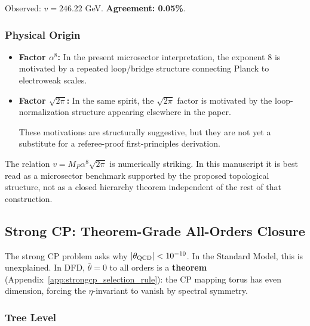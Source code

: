 Observed: $v = 246.22$ GeV. \textbf{Agreement: 0.05\%}.

\subsubsection{Physical Origin}

\begin{itemize}
\item \textbf{Factor $\alpha^8$:} In the present microsector interpretation, the exponent 8 is motivated by a repeated loop/bridge structure connecting Planck to electroweak scales.

\item \textbf{Factor $\sqrt{2\pi}$:} In the same spirit, the $\sqrt{2\pi}$ factor is motivated by the loop-normalization structure appearing elsewhere in the paper.

These motivations are structurally suggestive, but they are not yet a substitute for a referee-proof first-principles derivation.
\end{itemize}

\begin{tcolorbox}[colback=blue!5!white, colframe=blue!60!black, title=Electroweak-Scale Benchmark]
The relation $v = M_P\alpha^8\sqrt{2\pi}$ is numerically striking.  In this manuscript it is best read as a microsector benchmark supported by the proposed topological structure, not as a closed hierarchy theorem independent of the rest of that construction.
\end{tcolorbox}

\subsection{Strong CP: Theorem-Grade All-Orders Closure}\label{sec:strong-cp-loops}

The strong CP problem asks why $|\theta_{\rm QCD}| < 10^{-10}$. In the Standard Model, this is unexplained. In DFD, $\bar\theta = 0$ to all orders is a \textbf{theorem} (Appendix~\ref{app:strongcp_selection_rule}): the CP mapping torus has even dimension, forcing the $\eta$-invariant to vanish by spectral symmetry.

\subsubsection{Tree Level}

